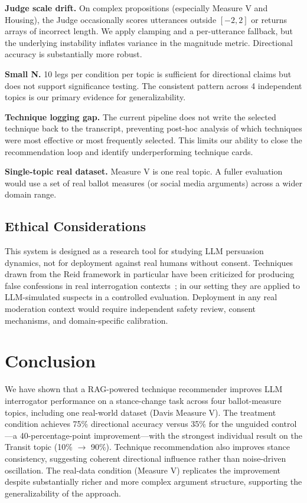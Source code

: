 \documentclass[sigconf]{acmart}
\begin{document}
\textbf{Judge scale drift.} On complex propositions (especially Measure V and
Housing), the Judge occasionally scores utterances outside $[-2,2]$ or returns
arrays of incorrect length. We apply clamping and a per-utterance fallback,
but the underlying instability inflates variance in the magnitude metric.
Directional accuracy is substantially more robust.

\textbf{Small N.} 10 legs per condition per topic is sufficient for directional
claims but does not support significance testing. The consistent pattern across
4 independent topics is our primary evidence for generalizability.

\textbf{Technique logging gap.} The current pipeline does not write the
selected technique back to the transcript, preventing post-hoc analysis of
which techniques were most effective or most frequently selected. This limits
our ability to close the recommendation loop and identify underperforming
technique cards.

\textbf{Single-topic real dataset.} Measure V is one real topic. A fuller
evaluation would use a set of real ballot measures (or social media arguments)
across a wider domain range.

\subsection{Ethical Considerations}
This system is designed as a research tool for studying LLM persuasion
dynamics, not for deployment against real humans without consent. Techniques
drawn from the Reid framework in particular have been criticized for producing
false confessions in real interrogation contexts~\cite{leo2008police}; in our
setting they are applied to LLM-simulated suspects in a controlled evaluation.
Deployment in any real moderation context would require independent safety
review, consent mechanisms, and domain-specific calibration.

\section{Conclusion}

We have shown that a RAG-powered technique recommender improves LLM
interrogator performance on a stance-change task across four ballot-measure
topics, including one real-world dataset (Davis Measure V). The treatment
condition achieves 75\% directional accuracy versus 35\% for the unguided
control---a 40-percentage-point improvement---with the strongest individual
result on the Transit topic (10\% $\to$ 90\%). Technique recommendation
also improves stance consistency, suggesting coherent directional influence
rather than noise-driven oscillation. The real-data condition (Measure V)
replicates the improvement despite substantially richer and more complex
argument structure, supporting the generalizability of the approach.
\end{document}
